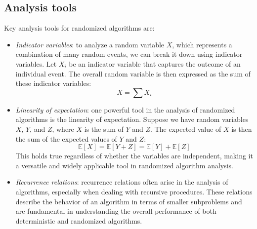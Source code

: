 \subsection{Analysis tools}
Key analysis tools for randomized algorithms are: 
\begin{itemize}
    \item \textit{Indicator variables}: to analyze a random variable $X$, which represents a combination of many random events, we can break it down using indicator variables. 
        Let $X_i$ be an indicator variable that captures the outcome of an individual event. 
        The overall random variable is then expressed as the sum of these indicator variables:
        \[X = \sum X_i\]
    \item \textit{Linearity of expectation}: one powerful tool in the analysis of randomized algorithms is the linearity of expectation. 
        Suppose we have random variables $X$, $Y$, and $Z$, where $X$ is the sum of $Y$ and $Z$. 
        The expected value of $X$ is then the sum of the expected values of $Y$ and $Z$:
        \[\mathbb{E}[X] = \mathbb{E}[Y + Z] = \mathbb{E}[Y] + \mathbb{E}[Z]\]
        This holds true regardless of whether the variables are independent, making it a versatile and widely applicable tool in randomized algorithm analysis.
    \item \textit{Recurrence relations}: recurrence relations often arise in the analysis of algorithms, especially when dealing with recursive procedures. 
        These relations describe the behavior of an algorithm in terms of smaller subproblems and are fundamental in understanding the overall performance of both deterministic and randomized algorithms.
\end{itemize}